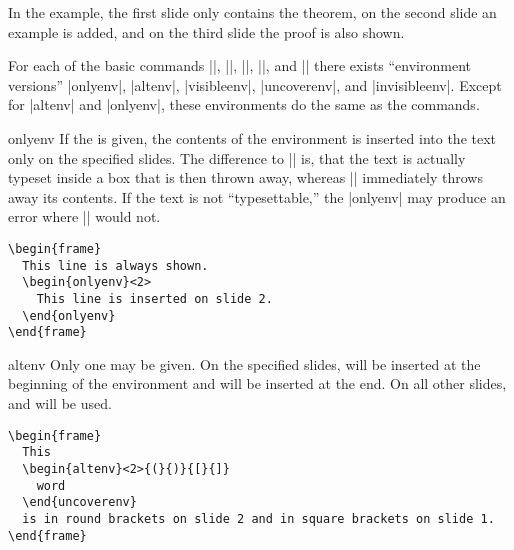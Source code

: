 In the example, the first slide only contains the theorem, on the second slide an example is added, and on the third slide the proof is also shown.

For each of the basic commands |\only|, |\alt|, |\visible|, |\uncover|, and |\invisible| there exists ``environment versions'' |onlyenv|, |altenv|, |visibleenv|, |uncoverenv|, and |invisibleenv|. Except for |altenv| and |onlyenv|, these environments do the same as the commands.

\begin{environment}{{onlyenv}}
  If the  is given, the contents of the environment is inserted into the text only on the specified slides. The difference to |\only| is, that the text is actually typeset inside a box that is then thrown away, whereas |\only| immediately throws away its contents. If the text is not ``typesettable,'' the |onlyenv| may produce an error where |\only| would not.

  \example
\begin{verbatim}
\begin{frame}
  This line is always shown.
  \begin{onlyenv}<2>
    This line is inserted on slide 2.
  \end{onlyenv}
\end{frame}
\end{verbatim}
\end{environment}

\begin{environment}{{altenv}}
  Only one  may be given. On the specified slides,  will be inserted at the beginning of the environment and  will be inserted at the end. On all other slides,  and  will be used.

  \example
\begin{verbatim}
\begin{frame}
  This
  \begin{altenv}<2>{(}{)}{[}{]}
    word
  \end{uncoverenv}
  is in round brackets on slide 2 and in square brackets on slide 1.
\end{frame}
\end{verbatim}
\end{environment}


